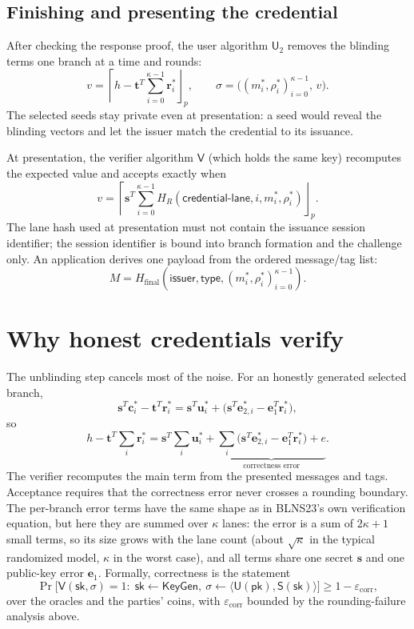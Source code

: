 \documentclass[11pt]{article}
\newcommand{\roundp}[1]{\left\lceil #1\right\rfloor_p}
\newcommand{\U}{\mathsf{U}}
\renewcommand{\S}{\mathsf{S}}
\newcommand{\Vrf}{\mathsf{V}}
\begin{document}
\subsection{Finishing and presenting the credential}

After checking the response proof, the user algorithm $\U_2$ removes the
blinding terms one branch at a time and rounds:
\[
 v=\roundp{h-\mathbf t^{T}\sum_{i=0}^{\kappa-1}\mathbf r_i^*},
 \qquad
 \sigma=\bigl((m_i^*,\rho_i^*)_{i=0}^{\kappa-1},\,v\bigr).
\]
The selected seeds stay private even at presentation: a seed would reveal the
blinding vectors and let the issuer match the credential to its issuance.

At presentation, the verifier algorithm $\Vrf$ (which holds the same key)
recomputes the expected value and accepts exactly when
\[
 v=\roundp{\mathbf s^{T}\sum_{i=0}^{\kappa-1}
        H_R(\mathsf{credential\mbox{-}lane},i,m_i^*,\rho_i^*)}.
\]
The lane hash used at presentation must not
contain the issuance session identifier; the session identifier is bound into
branch formation and the challenge only.  An application derives one payload
from the ordered message/tag list:
\[
 M=H_{\mathrm{final}}(\mathsf{issuer},\mathsf{type},
              (m_i^*,\rho_i^*)_{i=0}^{\kappa-1}).
\]

\section{Why honest credentials verify}
\label{sec:correctness}

The unblinding step cancels most of the noise.  For an honestly generated
selected branch,
\[
 \mathbf s^{T}\mathbf c_i^*-\mathbf t^{T}\mathbf r_i^*
 =\mathbf s^{T}\mathbf u_i^*
  +\bigl(\mathbf s^{T}\mathbf e_{2,i}^*-\mathbf e_1^{T}\mathbf r_i^*\bigr),
\]
so
\[
 h-\mathbf t^{T}\sum_i\mathbf r_i^*
 =\mathbf s^{T}\sum_i\mathbf u_i^*
  +\underbrace{\sum_i\bigl(\mathbf s^{T}\mathbf e_{2,i}^*
       -\mathbf e_1^{T}\mathbf r_i^*\bigr)+e}_{\text{correctness error}}.
\]
The verifier recomputes the main term from the presented messages and tags.
Acceptance requires that the correctness error never crosses a rounding
boundary.  The per-branch error terms have the same shape as in BLNS23's own
verification equation, but here they are summed over $\kappa$ lanes: the
error is a sum of $2\kappa+1$ small terms, so its size grows
with the lane count (about $\sqrt{\kappa}$ in the typical randomized model,
$\kappa$ in the worst case), and all terms
share one secret $\mathbf s$ and one public-key error $\mathbf e_1$.
Formally, correctness is the statement
\[
 \Pr\bigl[\Vrf(\mathsf{sk},\sigma)=1:\;
   \mathsf{sk}\leftarrow\mathsf{KeyGen},\
   \sigma\leftarrow\langle\U(\mathsf{pk}),\S(\mathsf{sk})\rangle\bigr]
 \ge 1-\varepsilon_{\mathrm{corr}},
\]
over the oracles and the parties' coins, with
$\varepsilon_{\mathrm{corr}}$ bounded by the rounding-failure analysis above.
\end{document}

